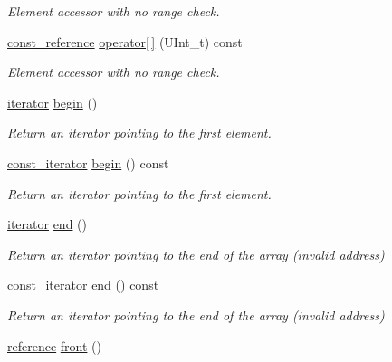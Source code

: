 \begin{DoxyCompactItemize}
\begin{DoxyCompactList}\small\item\em Element accessor with no range check. \end{DoxyCompactList}\item 
\hyperlink{classpanda_1_1Container_a336135bd19b8b176006d8e7413c8c8f1}{const\-\_\-reference} \hyperlink{classpanda_1_1Container_ad2052c3a54d9bd52f988bd7e1b8704d3}{operator\mbox{[}$\,$\mbox{]}} (U\-Int\-\_\-t) const 
\begin{DoxyCompactList}\small\item\em Element accessor with no range check. \end{DoxyCompactList}\item 
\hyperlink{classpanda_1_1Container_a6cc72f63b5ff916743cfd82f3d06aace}{iterator} \hyperlink{classpanda_1_1Container_ab7c524e0bda448e2b1ef3ba88f820a93}{begin} ()
\begin{DoxyCompactList}\small\item\em Return an iterator pointing to the first element. \end{DoxyCompactList}\item 
\hyperlink{classpanda_1_1Container_a0f9926d6b9fa94064fdbe119f0da78ed}{const\-\_\-iterator} \hyperlink{classpanda_1_1Container_ab877d1d6d361a300aa917836f0c8876e}{begin} () const 
\begin{DoxyCompactList}\small\item\em Return an iterator pointing to the first element. \end{DoxyCompactList}\item 
\hyperlink{classpanda_1_1Container_a6cc72f63b5ff916743cfd82f3d06aace}{iterator} \hyperlink{classpanda_1_1Container_ac063e06f3e792ff475f28cd502abf843}{end} ()
\begin{DoxyCompactList}\small\item\em Return an iterator pointing to the end of the array (invalid address) \end{DoxyCompactList}\item 
\hyperlink{classpanda_1_1Container_a0f9926d6b9fa94064fdbe119f0da78ed}{const\-\_\-iterator} \hyperlink{classpanda_1_1Container_a90cc2a139fc2289aa5b5f627b07486f4}{end} () const 
\begin{DoxyCompactList}\small\item\em Return an iterator pointing to the end of the array (invalid address) \end{DoxyCompactList}\item 
\hyperlink{classpanda_1_1Container_a3b6330ccf0d9ed33975d098520f103cb}{reference} \hyperlink{classpanda_1_1Container_a918c69810c2cc57f136bea5a2d5ef617}{front} ()

\end{DoxyCompactItemize}
